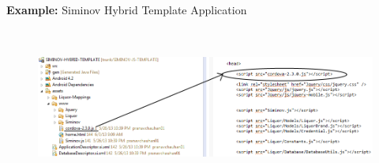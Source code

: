 \begin{enumerate}
		\par
		\textbf{Example:} Siminov Hybrid Template Application
		\begin{figure}[htbp]
			\centering
				\includegraphics[height=5.2cm]{Resources/siminov_hybrid_template_application_include_cordova_into_project.png}
		\end{figure}	

	
\end{enumerate}
